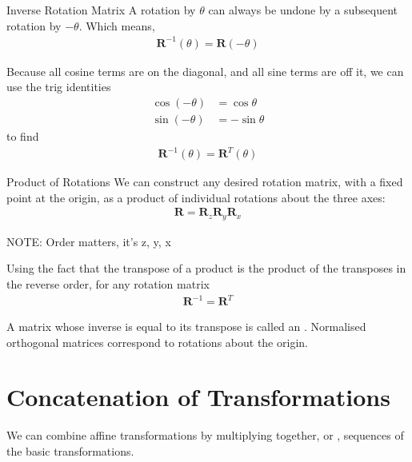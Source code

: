 \documentclass[../COS3712_Notes.tex]{subfiles}
\begin{document}
        \pagebreak

        \begin{theorem}{Inverse Rotation Matrix}
          A rotation by $\theta$ can always be undone by a subsequent rotation by $-\theta$.
          Which means,
          \begin{align*}
            \mathbf{R}^{-1}(\theta) = \mathbf{R}(-\theta)
          \end{align*}

          Because all cosine terms are on the diagonal, and all sine terms are off it,
          we can use the trig identities
          \begin{align*}
            \cos(-\theta) &= \cos\theta\\
            \sin(-\theta) &= -\sin\theta
          \end{align*}
          to find
          \begin{align*}
            \mathbf{R}^{-1}(\theta) = \mathbf{R}^{T}(\theta)
          \end{align*}
        \end{theorem}

        \begin{sidenote}{Product of Rotations}
          We can construct any desired rotation matrix, with a fixed point at the origin,
          as a product of individual rotations about the three axes:
          \begin{align*}
            \mathbf{R} = \mathbf{R}_z\mathbf{R}_y\mathbf{R}_x
          \end{align*}

          NOTE: Order matters, it's z, y, x
        \end{sidenote}

        Using the fact that the transpose of a product is the product of the transposes
        in the reverse order, for any rotation matrix
        \begin{align*}
          \mathbf{R}^{-1} = \mathbf{R}^T
        \end{align*}

        A matrix whose inverse is equal to its transpose is called an .
        Normalised orthogonal matrices correspond to rotations about the origin.

    \section{Concatenation of Transformations}
      We can combine affine transformations by multiplying together, or ,
      sequences of the basic transformations.
\end{document}
